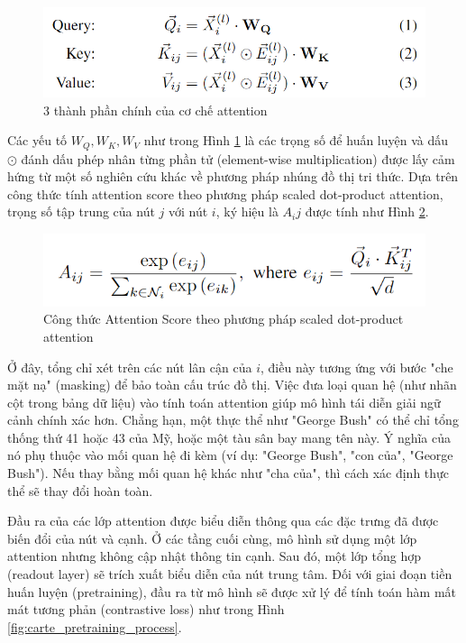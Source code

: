 \documentclass{article}
\begin{document}
\begin{figure} 
    \centering
    \includegraphics[scale = 0.8]{architecture_attention_mechanic.png}
    \caption{3 thành phần chính của cơ chế attention}
    \label{fig:architecture_attention_mechanic}
\end{figure}

Các yếu tố $W_Q, W_K, W_V$ như trong Hình \ref{fig:architecture_attention_mechanic} là các trọng số để huấn luyện và dấu $\odot$ đánh dấu phép nhân từng phần tử (element-wise multiplication) được lấy cảm hứng từ một số nghiên cứu khác về phương pháp nhúng đồ thị tri thức. Dựa trên công thức tính attention score theo phương pháp scaled dot-product attention, trọng số tập trung của nút $j$ với nút $i$, ký hiệu là $A_ij$ được tính như Hình \ref{fig:attention_score}. 

\begin{figure} 
    \centering
    \includegraphics[scale = 0.8]{attention_score.png}
    \caption{Công thức Attention Score theo phương pháp scaled dot-product attention}
    \label{fig:attention_score}
\end{figure}

Ở đây, tổng chỉ xét trên các nút lân cận của $i$, điều này tương ứng với bước "che mặt nạ" (masking) để bảo toàn cấu trúc đồ thị. Việc đưa loại quan hệ (như nhãn cột trong bảng dữ liệu) vào tính toán attention giúp mô hình tái diễn giải ngữ cảnh chính xác hơn. Chẳng hạn, một thực thể như "George Bush" có thể chỉ tổng thống thứ 41 hoặc 43 của Mỹ, hoặc một tàu sân bay mang tên này. Ý nghĩa của nó phụ thuộc vào mối quan hệ đi kèm (ví dụ: "George Bush", "con của", "George Bush"). Nếu thay bằng mối quan hệ khác như "cha của", thì cách xác định thực thể sẽ thay đổi hoàn toàn.

Đầu ra của các lớp attention được biểu diễn thông qua các đặc trưng đã được biến đổi của nút và cạnh. Ở các tầng cuối cùng, mô hình sử dụng một lớp attention nhưng không cập nhật thông tin cạnh. Sau đó, một lớp tổng hợp (readout layer) sẽ trích xuất biểu diễn của nút trung tâm. Đối với giai đoạn tiền huấn luyện (pretraining), đầu ra từ mô hình sẽ được xử lý để tính toán hàm mất mát tương phản (contrastive loss) như trong Hình \ref{fig:carte_pretraining_process}. 
\end{document}

